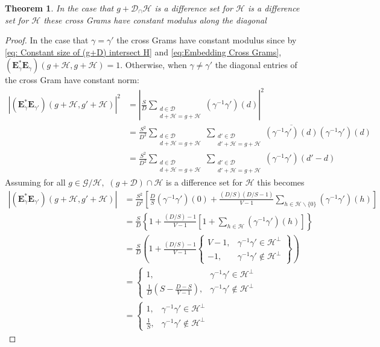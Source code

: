 \documentclass[3p,11pt]{elsarticle}
\newcommand{\bfE}{\mathbf{E}}
\newcommand{\calD}{\mathcal{D}}
\newcommand{\calG}{\mathcal{G}}
\newcommand{\calH}{\mathcal{H}}
\newcommand{\abs}[1]{|{#1}|}
\newtheorem{theorem}{Theorem}[section]
\theoremstyle{definition}
\begin{document}
\begin{theorem}
\label{thm: Cross Grams have constant modulus}
In the case that $g+\calD_\cap\calH$ is a difference set for $\calH$ is a difference set for $\calH$ these cross Grams have constant modulus along the diagonal
\end{theorem}
\begin{proof}
In the case that $\gamma=\gamma'$ the cross Grams have constant modulus since by \eqref{eq: Constant size of (g+D) intersect H} and \eqref{eq:Embedding Cross Grams}, $(\bfE_\gamma^*\bfE_\gamma)(g+\calH,g+\calH)=1.$
Otherwise, when $\gamma\not=\gamma'$ the diagonal entries of the cross Gram have constant norm:
\begin{align*}
\abs{(\bfE_\gamma^*\bfE_{\gamma'})(g+\calH,g'+\calH)}^2&=\abs{\tfrac{S}{D}\sum_{\substack{d\in\calD\\d+\calH=g+\calH}}(\gamma^{-1}\gamma')(d)}^2\\
&=\tfrac{S^2}{D^2}\sum_{\substack{d\in\calD\\d+\calH=g+\calH}}\sum_{\substack{d'\in\calD\\d'+\calH=g+\calH}}\overline{(\gamma^{-1}\gamma')(d)}(\gamma^{-1}\gamma')(d)\\
&=\tfrac{S^2}{D^2}\sum_{\substack{d\in\calD\\d+\calH=g+\calH}}\sum_{\substack{d'\in\calD\\d'+\calH=g+\calH}}(\gamma^{-1}\gamma')(d'-d)
\end{align*}
Assuming for all $g\in\calG/\calH,$ $(g+\calD)\cap\calH$ is a difference set for $\calH$ this becomes 
\begin{align*}
\abs{(\bfE_\gamma^*\bfE_{\gamma'})(g+\calH,g'+\calH)}&=\tfrac{S^2}{D^2}\left[\tfrac{D}{S}(\gamma^{-1}\gamma')(0)+\tfrac{(D/S)(D/S-1)}{V-1}\sum_{h\in\calH\backslash\{0\}}(\gamma^{-1}\gamma')(h)\right]\\
&=\tfrac{S}{D}\left\{1+\tfrac{(D/S)-1}{V-1}\left[1+\sum_{h\in\calH}(\gamma^{-1}\gamma')(h)\right]\right\}\\
&=\tfrac{S}{D}\left(1+\tfrac{(D/S)-1}{V-1}\left\{\begin{array}{cl}
V-1, & \gamma^{-1}\gamma'\in\calH^\perp\\
-1, &\gamma^{-1}\gamma'\not\in\calH^\perp
\end{array}\right\}\right)\\
&=\left\{\begin{array}{cl}
1, & \gamma^{-1}\gamma'\in\calH^\perp\\
\tfrac{1}{D}\left(S-\tfrac{D-S}{V-1}\right), &\gamma^{-1}\gamma'\not\in\calH^\perp
\end{array}\right.\\
&=\left\{\begin{array}{cl}
1, & \gamma^{-1}\gamma'\in\calH^\perp\\
\tfrac{1}{S}, &\gamma^{-1}\gamma'\not\in\calH^\perp
\end{array}\right.
\end{align*}
\end{proof}
\end{document}
